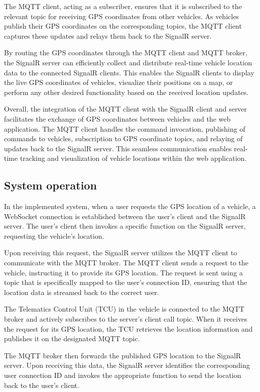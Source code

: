 \documentclass[
12pt,
oneside, 
onehalfspacing, 
nolistspacing, 
parskip, 
chapterinoneline, 
]{AASTCOMPUTER}
\begin{document}
The MQTT client, acting as a subscriber, ensures that it is subscribed to the relevant topic for receiving GPS coordinates from other vehicles. As vehicles publish their GPS coordinates on the corresponding topics, the MQTT client captures these updates and relays them back to the SignalR server.

By routing the GPS coordinates through the MQTT client and MQTT broker, the SignalR server can efficiently collect and distribute real-time vehicle location data to the connected SignalR clients. This enables the SignalR clients to display the live GPS coordinates of vehicles, visualize their positions on a map, or perform any other desired functionality based on the received location updates.

Overall, the integration of the MQTT client with the SignalR client and server facilitates the exchange of GPS coordinates between vehicles and the web application. The MQTT client handles the command invocation, publishing of commands to vehicles, subscription to GPS coordinate topics, and relaying of updates back to the SignalR server. This seamless communication enables real-time tracking and visualization of vehicle locations within the web application.

\subsection{System operation}
In the implemented system, when a user requests the GPS location of a vehicle, a WebSocket connection is established between the user's client and the SignalR server. The user's client then invokes a specific function on the SignalR server, requesting the vehicle's location. 

Upon receiving this request, the SignalR server utilizes the MQTT client to communicate with the MQTT broker. The MQTT client sends a request to the vehicle, instructing it to provide its GPS location. The request is sent using a topic that is specifically mapped to the user's connection ID, ensuring that the location data is streamed back to the correct user.

The Telematics Control Unit (TCU) in the vehicle is connected to the MQTT broker and actively subscribes to the server's client call topic. When it receives the request for its GPS location, the TCU retrieves the location information and publishes it on the designated MQTT topic.

The MQTT broker then forwards the published GPS location to the SignalR server. Upon receiving this data, the SignalR server identifies the corresponding user connection ID and invokes the appropriate function to send the location back to the user's client.
\end{document}
